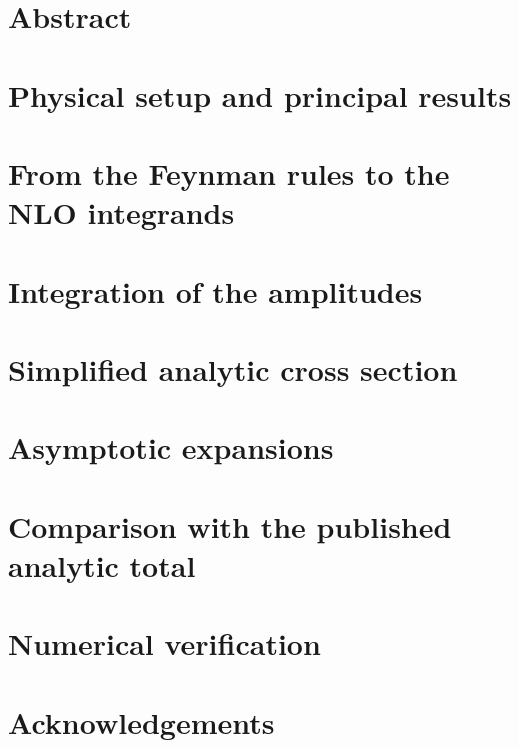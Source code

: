 \documentclass[11pt,oneside]{book}
\title{\comptondocumenttitle}
\author{}
\date{4 October 2026}
\begin{document}
\hypersetup{pageanchor=false}
\maketitle
\clearpage
\hypersetup{pageanchor=true}
\frontmatter
\chapter*{Abstract}

\tableofcontents
\mainmatter
\chapter{Physical setup and principal results}
\label{chap:comp-overview}

\chapter{From the Feynman rules to the NLO integrands}

\chapter{Integration of the amplitudes}

\chapter{Simplified analytic cross section}

\chapter{Asymptotic expansions}





\chapter{Comparison with the published analytic total}
\label{chap:comp-supp-reference-total}


\chapter{Numerical verification}

\begin{chapterreferences}


\end{chapterreferences}
\backmatter
\chapter*{Acknowledgements}

\end{document}
